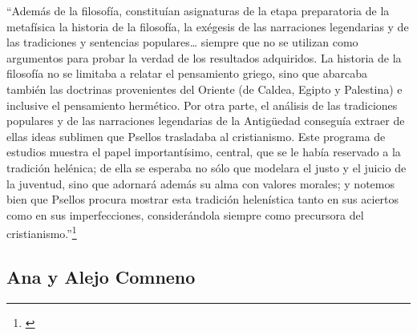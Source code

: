 	“Además de la filosofía, constituían asignaturas de la etapa preparatoria de la metafísica la historia de la filosofía, la exégesis de las narraciones legendarias y de las tradiciones y sentencias populares… siempre que no se utilizan como argumentos para probar la verdad de los resultados adquiridos. La historia de la filosofía no se limitaba  a relatar el pensamiento griego, sino que abarcaba también las doctrinas provenientes del Oriente (de Caldea, Egipto y Palestina) e inclusive el pensamiento hermético. Por otra parte, el análisis de las tradiciones populares y de las narraciones legendarias de la Antigüedad conseguía extraer de ellas ideas sublimen que Psellos trasladaba al cristianismo. Este programa de estudios muestra el papel importantísimo, central, que se le había reservado a la tradición helénica; de ella se esperaba no sólo que modelara el justo y el juicio de la juventud, sino que adornará además su alma con valores morales; y notemos bien que Psellos procura mostrar esta tradición helenística tanto en sus aciertos como en sus imperfecciones, considerándola siempre como precursora del cristianismo.”\footnote{\cite[p.~165]{filosofia}}

\subsection{Ana y Alejo Comneno}
